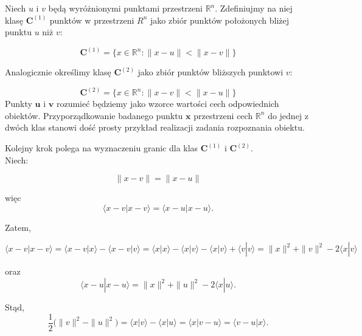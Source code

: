 Niech $u$ i $v$ będą wyróżnionymi punktami przestrzeni $\mathbb{R}^{n}$. Zdefiniujmy na niej klasę $\bm{C}^{(1)}$ punktów w przestrzeni $R^{n}$ jako zbiór punktów położonych bliżej punktu $u$ niż $v$:

\begin{equation}
    \bm{C}^{(1)} = \bigg\{ x \in \mathbb{R}^{n} : \| x - u\| < \| x - v\| \bigg\} 
\end{equation}

Analogicznie określimy klasę $\bm{C}^{(2)}$ jako zbiór punktów bliższych punktowi $v$:

\begin{equation}
    \bm{C}^{(2)} = \bigg\{ x \in \mathbb{R}^{n} : \|x - v\| < \| x - u\| \bigg\}
\end{equation}
Punkty $\bm{u}$ i $\bm{v}$ rozumieć będziemy jako wzorce wartości cech odpowiednich obiektów. Przyporządkowanie badanego punktu $\bm{x}$ przestrzeni cech $\mathbb{R}^{n}$ do jednej z dwóch klas stanowi dość prosty przykład realizacji zadania rozpoznania obiektu.

Kolejny krok polega na wyznaczeniu granic dla klas $\bm{C}^{(1)}$ i $\bm{C}^{(2)}$. 
\\
Niech:

\begin{equation}
\|{x - v}\| = \|{x- u}\|
\end{equation}

więc
\begin{equation}
    \big \langle x - v | x - v \big \rangle = \big \langle x - u | x - u \big \rangle.
\end{equation}

Zatem,

\begin{equation*}
    \big \langle x - v | x - v \big \rangle = \big \langle x - v |x \big \rangle - \big \langle x - v | v \big \rangle = \big \langle x | x \big \rangle - \big \langle x | v \big \rangle - \big \langle x | v \big \rangle + \big \langle v | v \big \rangle = \|x\|^{2} + \|v\|^{2} - 2 \big \langle x | v \big \rangle 
\end{equation*}

oraz
\begin{equation*}
    \big \langle x - u | x - u \big \rangle = \|x\|^{2} + \|u\|^{2} - 2 \big \langle x | u \big \rangle.
\end{equation*}

Stąd,
\begin{equation}
    \frac{1}{2} \big( \|v\|^{2} - \|u\|^{2} \big) = \big \langle x|v \big \rangle - \big \langle x|u \big \rangle = \big \langle x|v - u \big \rangle = \big \langle v - u|x \big \rangle.
\end{equation}

